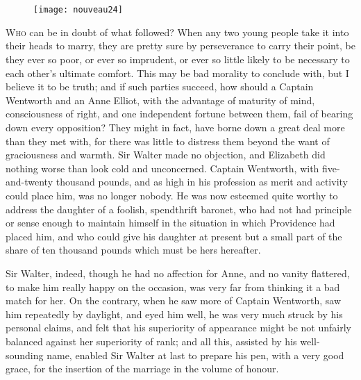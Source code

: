 \chapter[Chapter \thechapter]{}

\begin{figure}[t!]
\centering
\texttt{[image: nouveau24]}
\end{figure}

\lettrine[lraise=0.3]{W}{ho} can be in doubt of what followed? When any two young people take it into their heads to marry, they are pretty sure by perseverance to carry their point, be they ever so poor, or ever so imprudent, or ever so little likely to be necessary to each other's ultimate comfort. This may be bad morality to conclude with, but I believe it to be truth; and if such parties succeed, how should a Captain Wentworth and an Anne Elliot, with the advantage of maturity of mind, consciousness of right, and one independent fortune between them, fail of bearing down every opposition? They might in fact, have borne down a great deal more than they met with, for there was little to distress them beyond the want of graciousness and warmth. Sir Walter made no objection, and Elizabeth did nothing worse than look cold and unconcerned. Captain Wentworth, with five-and-twenty thousand pounds, and as high in his profession as merit and activity could place him, was no longer nobody. He was now esteemed quite worthy to address the daughter of a foolish, spendthrift baronet, who had not had principle or sense enough to maintain himself in the situation in which Providence had placed him, and who could give his daughter at present but a small part of the share of ten thousand pounds which must be hers hereafter.

Sir Walter, indeed, though he had no affection for Anne, and no vanity flattered, to make him really happy on the occasion, was very far from thinking it a bad match for her. On the contrary, when he saw more of Captain Wentworth, saw him repeatedly by daylight, and eyed him well, he was very much struck by his personal claims, and felt that his superiority of appearance might be not unfairly balanced against her superiority of rank; and all this, assisted by his well-sounding name, enabled Sir Walter at last to prepare his pen, with a very good grace, for the insertion of the marriage in the volume of honour.

